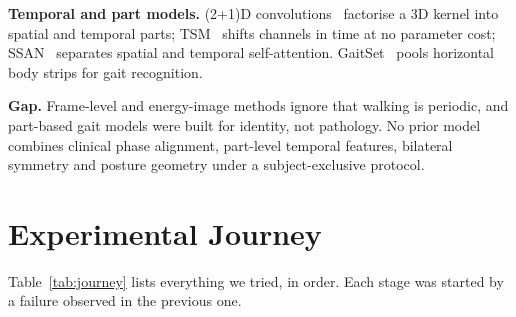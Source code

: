 \documentclass[conference]{IEEEtran}
\begin{document}
\textbf{Temporal and part models.} (2+1)D convolutions~\cite{tran2018r21d}
factorise a 3D kernel into spatial and temporal parts; TSM~\cite{lin2019tsm}
shifts channels in time at no parameter cost; SSAN~\cite{guo2021ssan} separates
spatial and temporal self-attention. GaitSet~\cite{chao2019gaitset} pools
horizontal body strips for gait recognition.

\textbf{Gap.} Frame-level and energy-image methods ignore that walking is
periodic, and part-based gait models were built for identity, not pathology. No
prior model combines clinical phase alignment, part-level temporal features,
bilateral symmetry and posture geometry under a subject-exclusive protocol.

\section{Experimental Journey}
Table~\ref{tab:journey} lists everything we tried, in order. Each stage was
started by a failure observed in the previous one.
\end{document}
